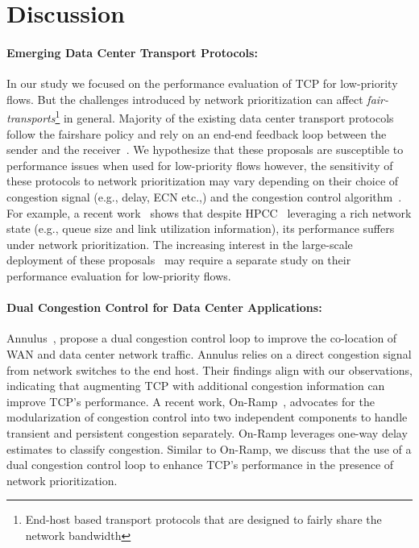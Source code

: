 \section{Discussion} 
\label{sec:discuss}
\paragraph{\textbf{Emerging Data Center Transport Protocols:}}
In our study we focused on the performance evaluation of TCP for low-priority flows. But the challenges introduced by network prioritization can affect \emph{fair-transports}\footnote{End-host based transport protocols that are designed to fairly share the network bandwidth} in general. Majority of the existing data center transport protocols follow the fairshare policy and rely on an end-end feedback loop between the sender and the receiver~\cite{dctcp,swift,timely,dcqcn,hpcc}. We hypothesize that these proposals are susceptible to performance issues when used for low-priority flows however, the sensitivity of these protocols to network prioritization may vary depending on their choice of congestion signal (e.g., delay, ECN etc.,) and the congestion control algorithm~\cite{ecn-or-delay,on-ramp}. For example, a recent work~\cite{bfc} shows that despite HPCC~\cite{hpcc} leveraging a rich network state (e.g., queue size and link utilization information), its performance suffers under network prioritization. The increasing interest in the large-scale deployment of these proposals~\cite{hpcc,dcqcn} may require a separate study on their performance evaluation for low-priority flows.


\paragraph{\textbf{Dual Congestion Control for Data Center Applications:}}
Annulus~\cite{annulus}, propose a dual congestion control loop to improve the co-location of WAN and data center network traffic. Annulus relies on a direct congestion signal from network switches to the end host.
Their findings align with our observations, indicating that augmenting TCP with additional congestion information can improve TCP's performance. A recent work, On-Ramp~\cite{on-ramp}, advocates for the modularization of congestion control into two independent components to handle transient and persistent congestion separately. On-Ramp leverages one-way delay estimates to classify congestion. Similar to On-Ramp, we discuss that the use of a dual congestion control loop to enhance TCP's performance in the presence of network prioritization.

